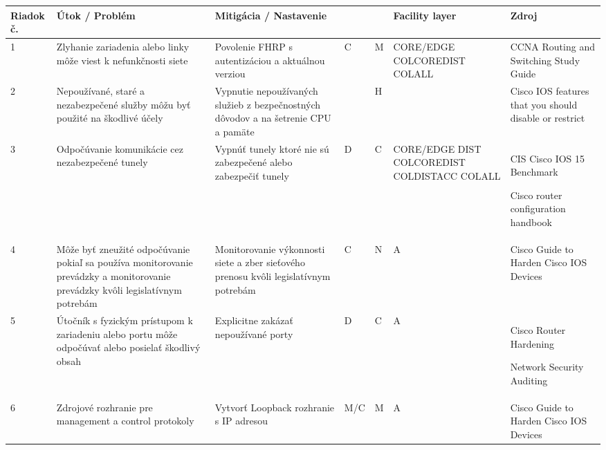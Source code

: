 \begin{longtable}[!htbp]{|C{2.5em}L{9em}L{9em}C{2em}C{2.5em}C{7.5em}L{10em}|}
	
	\hline
	\centering
	
	Riadok č.	&Útok / Problém	&Mitigácia / Nastavenie	& 	&	&Facility layer	&Zdroj\\
	\endhead
	
	 1	&Zlyhanie zariadenia alebo linky môže viest k nefunkčnosti siete 	&Povolenie FHRP s autentizáciou a aktuálnou verziou	&C	&M	&CORE/EDGE
	COLCOREDIST
	COLALL	&CCNA Routing and Switching Study Guide \cite{Lammle2013}\\
	2	&Nepoužívané, staré a nezabezpečené služby môžu byť použité na škodlivé účely	&Vypnutie nepoužívaných služieb z bezpečnostných dôvodov a na šetrenie CPU a pamäte 	& \footnotemark &H	&\footnotemark&Cisco IOS features that you should disable or restrict \cite{yDzYjF1hoACahpg1}\\
	 3	&Odpočúvanie komunikácie  cez nezabezpečené tunely	&Vypnúť tunely ktoré nie sú zabezpečené alebo zabezpečiť tunely	&D	&C	&CORE/EDGE
	DIST
	COLCOREDIST
	COLDISTACC
	COLALL	&CIS Cisco IOS 15 Benchmark \cite{CIS_DrTLsgXv24lxeIIM}
	
	Cisco router configuration handbook \cite{Hucaby2010}\\
	4	&Môže byť zneužité odpočúvanie pokiaľ sa používa monitorovanie prevádzky a monitorovanie prevádzky kvôli legislatívnym potrebám	&Monitorovanie výkonnosti siete a zber sieťového prenosu kvôli legislatívnym potrebám	&C	&N	&A	&Cisco Guide to Harden Cisco IOS Devices \cite{Singh2018}\\
	 5	&Útočník s fyzickým prístupom k zariadeniu alebo portu môže odpočúvať alebo posielať škodlivý obsah	&Explicitne zakázať nepoužívané porty	&D	&C	&A	&Cisco Router Hardening \cite{Graesser2001}
	
	Network Security Auditing \cite{Jackson2010}\\
	6	&Zdrojové rozhranie pre management a control protokoly	&Vytvorť Loopback rozhranie s IP adresou	&M/C	&M	&A	&
	Cisco Guide to Harden Cisco IOS Devices \cite{Singh2018}
	

\end{longtable}
